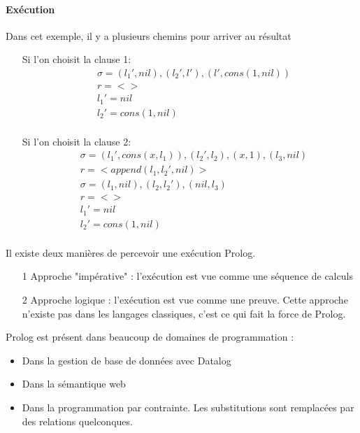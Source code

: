 \paragraph{Exécution}
Dans cet exemple, il y a plusieurs chemins pour arriver au résultat
\begin{itemize}
\item[] Si l'on choisit la clause 1: 
\begin{align*}
&\sigma = {(l_{1}',nil), (l_{2}',l'), (l',cons(1,nil))} \\
&r= < > \\
& l_{1}'=nil \\
& l_{2}'=cons(1,nil) \\
\end{align*}

\item[] Si l'on choisit la clause 2: 
\begin{align*}
&\sigma = {(l_{1}',cons(x,l_{1})), (l_{2}',l_{2}), (x,1), (l_{3},nil)} \\
&r= < append(l_{1},l_{2}',nil) > \\
&\sigma = {(l_{1},nil), (l_{2},l_{2}'), (nil,l_{3})} \\
&r= < > \\
& l_{1}'=nil \\
& l_{2}'=cons(1,nil) \\
\end{align*}

\end{itemize}


Il existe deux manières de percevoir une exécution Prolog.\\
\begin{itemize}
\item[1] Approche "impérative" : l'exécution est vue comme une séquence de calculs
\item[2] Approche logique : l'exécution est vue comme une preuve. Cette approche n'existe pas dans les langages classiques, c'est ce qui fait la force de Prolog.
\end{itemize}
Prolog est présent dans beaucoup de domaines de programmation :\\
\begin{itemize}
\item Dans la gestion de base de données avec Datalog
\item Dans la sémantique web
\item Dans la programmation par contrainte. Les substitutions sont remplacées par des relations quelconques.
\end{itemize}

